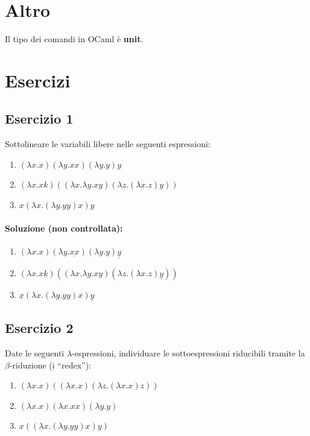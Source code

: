 \documentclass[12pt,a4paper]{article}
\let\oldsection\section
\renewcommand{\section}{\clearpage\oldsection}
\begin{document}
\section{Altro}
Il tipo dei comandi in OCaml è \textbf{unit}.

\section{Esercizi}
\subsection{Esercizio 1}
Sottolineare le variabili libere nelle seguenti espressioni:
\begin{enumerate}
  \item $(\lambda x.x)(\lambda y.xx)(\lambda y.y)y$
  \item $(\lambda x.xk)((\lambda x. \lambda y.xy)(\lambda z.(\lambda x.z)y))$
  \item $x(\lambda x.(\lambda y.yy)x)y$
\end{enumerate}
\paragraph{Soluzione (non controllata):}
\begin{enumerate}
  \item $(\lambda x.x)(\lambda y.\underline{xx})(\lambda y.y)\underline{y}$
  \item $(\lambda x.x\underline{k})((\lambda x. \lambda y.xy)(\lambda z.(\lambda x.z)\underline{y}))$
  \item $\underline{x}(\lambda x.(\lambda y.yy)x)\underline{y}$
\end{enumerate}
\subsection{Esercizio 2}
Date le seguenti $\lambda$-espressioni, individuare le sottoespressioni riducibili tramite la $\beta$-riduzione (i ``redex''):
\begin{enumerate}
    \item
    $(\lambda x.x)((\lambda x.x)(\lambda z.(\lambda x.x)z))$

    \item
    $(\lambda x.x)(\lambda x.xx)(\lambda y.y)$

    \item
    $x((\lambda x.(\lambda y.yy)x)y)$
\end{enumerate}
\end{document}
